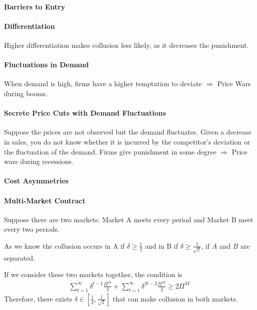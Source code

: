 \documentclass[11pt]{elegantbook_2}
\begin{document}
\paragraph*{Barriers to Entry}

\paragraph*{Differentiation} Higher differentiation makes collusion less likely, as it decreases the punishment.

\paragraph*{Fluctuations in Demand}
When demand is high, firms have a higher temptation to deviate $\Rightarrow$ Price Wars during booms.

\paragraph*{Secrete Price Cuts with Demand Fluctuations} Suppose the prices are not observed but the demand fluctuates. Given a decrease in sales, you do not know whether it is incurred by the competitor's deviation or the fluctuation of the demand. Firms give punishment in some degree $\Rightarrow$ Price wars during recessions.

\paragraph*{Cost Asymmetries}

\paragraph*{Multi-Market Contract}
Suppose there are two markets: Market A meets every period and Market B meet every two periods.

As we know the collusion occurs in A if $\delta\geq \frac{1}{2}$ and in B if $\delta\geq \frac{1}{\sqrt{2}}$, if $A$ and $B$ are separated.

If we consider these two markets together, the condition is
\begin{equation}
    \begin{aligned}
        \sum_{t=1}^\infty\delta^{t-1}\frac{\Pi^M}{2}+\sum_{t=1}^\infty\delta^{2t-2}\frac{\Pi^M}{2}\geq 2\Pi^M
    \end{aligned}
    \nonumber
\end{equation}
Therefore, there exists $\delta\in \left[\frac{1}{2},\frac{1}{\sqrt{2}}\right]$ that can make collusion in both markets.
\end{document}

